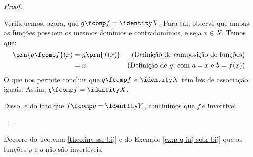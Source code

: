 \begin{proof}
\begin{itemize}
        Verifiquemos, agora, que $g \fcomp f = \identity X$.
        Para tal, observe que ambas as funções possuem os mesmos domínios e contradomínios, e seja $x \in X$.
        Temos que:
        \begin{align*}
            \prn{g \fcomp f}(x) & = g\prn{f(x)} & \text{(Definição de composição de funções)} \\ 
             &= x. & \text{(Definição de $g$, com $a=x$ e $b=f(x)$)}
        \end{align*}
        O que nos permite concluir que $g \fcomp f$ e $\identity X$ têm leis de associação iguais.
        Assim, $g \fcomp f = \identity X$.

        Disso, e do fato que $f \fcomp g = \identity Y$, concluímos que $f$ é invertível.
    \end{itemize}
\end{proof}

\begin{example}
    Decorre do Teorema \ref{theo:inv-sse-bij} e do Exemplo \ref{ex:p-q-inj-sobr-bij} que as funções $p$ e $q$ não são invertíveis.
\end{example}